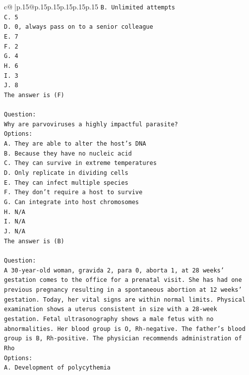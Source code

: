 \documentclass{article}
\begin{document}
{\begin{supertabular}{c@{$\;$}|p{.15\linewidth}@{}p{.15\linewidth}p{.15\linewidth}p{.15\linewidth}p{.15\linewidth}p{.15\linewidth}}
{{{\texttt{B. Unlimited attempts} \\
\texttt{C. 5} \\
\texttt{D. 0, always pass on to a senior colleague} \\
\texttt{E. 7} \\
\texttt{F. 2} \\
\texttt{G. 4} \\
\texttt{H. 6} \\
\texttt{I. 3} \\
\texttt{J. 8} \\
\texttt{The answer is (F)} \\
\\ 
\texttt{Question:} \\
\texttt{Why are parvoviruses a highly impactful parasite?} \\
\texttt{Options:} \\
\texttt{A. They are able to alter the host's DNA} \\
\texttt{B. Because they have no nucleic acid} \\
\texttt{C. They can survive in extreme temperatures} \\
\texttt{D. Only replicate in dividing cells} \\
\texttt{E. They can infect multiple species} \\
\texttt{F. They don't require a host to survive} \\
\texttt{G. Can integrate into host chromosomes} \\
\texttt{H. N/A} \\
\texttt{I. N/A} \\
\texttt{J. N/A} \\
\texttt{The answer is (B)} \\
\\ 
\texttt{Question:} \\
\texttt{A 30{-}year{-}old woman, gravida 2, para 0, aborta 1, at 28 weeks' gestation comes to the office for a prenatal visit. She has had one previous pregnancy resulting in a spontaneous abortion at 12 weeks' gestation. Today, her vital signs are within normal limits. Physical examination shows a uterus consistent in size with a 28{-}week gestation. Fetal ultrasonography shows a male fetus with no abnormalities. Her blood group is O, Rh{-}negative. The father's blood group is B, Rh{-}positive. The physician recommends administration of Rho} \\
\texttt{Options:} \\
\texttt{A. Development of polycythemia} \\
}}}
\end{supertabular}}
\end{document}
